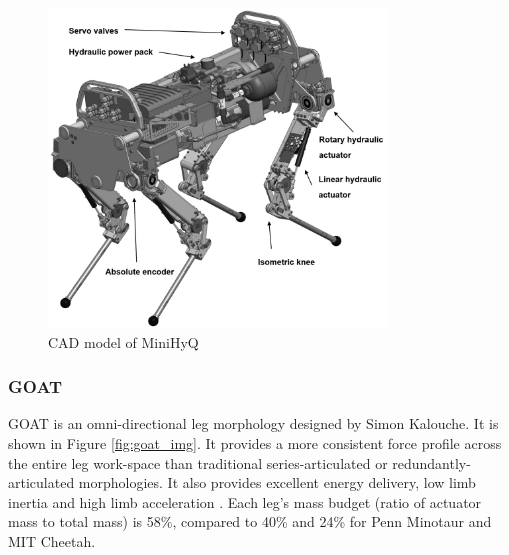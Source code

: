 \begin{figure}[H]
    \centering
    \includegraphics[width=0.8\textwidth]{Sections/LiteratureReview/img/minihyq/exsol_minihyq.png}
    \caption{CAD model of MiniHyQ \cite{khan_minihyq_2015}}
    \label{fig:minihyq_cad}
\end{figure}

\subsubsection{GOAT}

GOAT is an omni-directional leg morphology designed by Simon Kalouche.  It is shown in Figure \ref{fig:goat_img}. It provides a more consistent force profile across the entire leg work-space than traditional series-articulated or redundantly-articulated morphologies. It also provides excellent energy delivery, low limb inertia and high limb acceleration \cite{kalouche_design_2016}.
Each leg's mass budget (ratio of actuator mass to total mass) is 58\%, compared to 40\% and 24\% for Penn Minotaur and MIT Cheetah.

